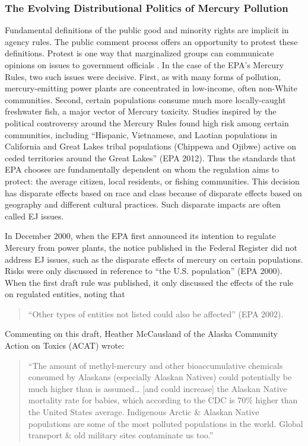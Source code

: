 \documentclass[
      12pt,
        ]{article}
\begin{document}
\hypertarget{the-evolving-distributional-politics-of-mercury-pollution}{%
\subsubsection{The Evolving Distributional Politics of Mercury Pollution}\label{the-evolving-distributional-politics-of-mercury-pollution}}

Fundamental definitions of the public good and minority rights are
implicit in agency rules. The public comment process offers an
opportunity to protest these definitions. Protest is one way that
marginalized groups can communicate opinions on issues to government
officials \citep{Gillion2013}. In the case of the EPA's Mercury Rules, two
such issues were decisive. First, as with many forms of pollution,
mercury-emitting power plants are concentrated in low-income, often
non-White communities. Second, certain populations consume much more
locally-caught freshwater fish, a major vector of Mercury toxicity.
Studies inspired by the political controversy around the Mercury Rules
found high risk among certain communities, including ``Hispanic, Vietnamese, and
Laotian populations in California and Great Lakes tribal populations
(Chippewa and Ojibwe) active on ceded territories around the Great
Lakes'' (EPA 2012). Thus the standards that EPA chooses are fundamentally
dependent on whom the regulation aims to protect: the average citizen,
local residents, or fishing communities. This decision has disparate
effects based on race and class because of disparate effects based on
geography and different cultural practices. Such disparate impacts are
often called EJ issues.

In December 2000, when the EPA first announced its intention to regulate
Mercury from power plants, the notice published in the Federal Register
did not address EJ issues, such as the disparate
effects of mercury on certain populations. Risks were only discussed in
reference to ``the U.S. population'' (EPA 2000). When the first draft rule
was published, it only discussed the effects of the rule on regulated
entities, noting that

\begin{quote}
``Other types of entities not listed could also be
affected'' (EPA 2002).
\end{quote}

Commenting on this draft, Heather McCausland of
the Alaska Community Action on Toxics (ACAT) wrote:

\begin{quote}
``The amount of methyl-mercury and other bioaccumulative chemicals
consumed by Alaskans (especially Alaskan Natives) could potentially be
much higher than is assumed\ldots{} {[}and could increase{]} the Alaskan Native mortality rate for
babies, which according to the CDC is 70\% higher than the United States
average. Indigenous Arctic \& Alaskan Native populations are some of
the most polluted populations in the world.
Global transport \& old military sites contaminate us too.''
\end{quote}
\end{document}
